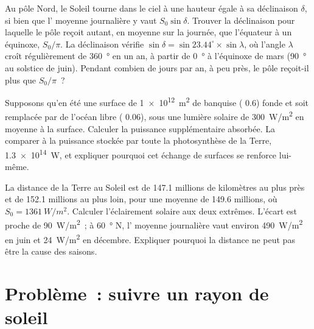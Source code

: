 \begin{exercise}[$\star\star\star$]\label{exo:g10:earth-energy-budget:13}
Au pôle Nord, le Soleil tourne dans le ciel à une hauteur égale à sa
déclinaison $\delta$, si bien que l' moyenne journalière y vaut
$S_0 \sin
\delta$. Trouver la déclinaison pour laquelle le pôle reçoit
autant, en moyenne sur la journée, que l'équateur à un équinoxe, $S_0/\pi$.
La déclinaison vérifie $\sin\delta = \sin 23.44^\circ \times \sin\lambda$,
où l'angle $\lambda$ croît régulièrement de \qty{360}{\degree} en un an, à
partir de \qty{0}{\degree} à l'équinoxe de mars (\qty{90}{\degree} au
solstice de juin). Pendant combien de jours par an, à peu près, le pôle
reçoit-il plus que $S_0/\pi$~?
\end{exercise}

\begin{exercise}[$\star\star\star$]\label{exo:g10:earth-energy-budget:14}
Supposons qu'en été une surface de \qty{1e12}{m^2} de banquise ( 0.6)
fonde et soit remplacée par de l'océan libre ( 0.06), sous une lumière
solaire de \qty{300}{W/m^2} en moyenne à la surface. Calculer la puissance
supplémentaire absorbée. La comparer à la puissance stockée par toute la
photosynthèse de la Terre, \qty{1.3e14}{W}, et expliquer pourquoi cet
échange de surfaces se renforce lui-même.
\end{exercise}

\begin{exercise}[$\star\star\star$]\label{exo:g10:earth-energy-budget:15}
La distance de la Terre au Soleil est de \num{147.1} millions de kilomètres
au plus près et de \num{152.1} millions au plus loin, pour une moyenne de
\num{149.6} millions, où $S_0 = \qty{1361}{W/m^2}$. Calculer l'éclairement
solaire aux deux extrêmes. L'écart est proche de \qty{90}{W/m^2}~; à
\qty{60}{\degree} N, l' moyenne journalière vaut environ
\qty{490}{W/m^2} en juin et \qty{24}{W/m^2} en décembre. Expliquer pourquoi
la distance ne peut pas être la cause des saisons.
\end{exercise}

\section{Problème~: suivre un rayon de soleil}

